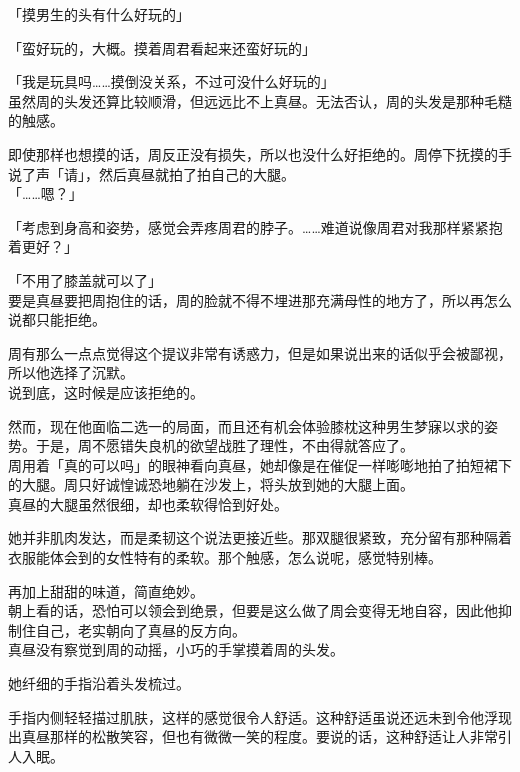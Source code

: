 「摸男生的头有什么好玩的」

「蛮好玩的，大概。摸着周君看起来还蛮好玩的」

「我是玩具吗……摸倒没关系，不过可没什么好玩的」\\

虽然周的头发还算比较顺滑，但远远比不上真昼。无法否认，周的头发是那种毛糙的触感。

即使那样也想摸的话，周反正没有损失，所以也没什么好拒绝的。周停下抚摸的手说了声「请」，然后真昼就拍了拍自己的大腿。\\

「……嗯？」

「考虑到身高和姿势，感觉会弄疼周君的脖子。……难道说像周君对我那样紧紧抱着更好？」

「不用了膝盖就可以了」\\

要是真昼要把周抱住的话，周的脸就不得不埋进那充满母性的地方了，所以再怎么说都只能拒绝。

周有那么一点点觉得这个提议非常有诱惑力，但是如果说出来的话似乎会被鄙视，所以他选择了沉默。\\

说到底，这时候是应该拒绝的。

然而，现在他面临二选一的局面，而且还有机会体验膝枕这种男生梦寐以求的姿势。于是，周不愿错失良机的欲望战胜了理性，不由得就答应了。\\

周用着「真的可以吗」的眼神看向真昼，她却像是在催促一样嘭嘭地拍了拍短裙下的大腿。周只好诚惶诚恐地躺在沙发上，将头放到她的大腿上面。\\

真昼的大腿虽然很细，却也柔软得恰到好处。

她并非肌肉发达，而是柔韧这个说法更接近些。那双腿很紧致，充分留有那种隔着衣服能体会到的女性特有的柔软。那个触感，怎么说呢，感觉特别棒。

再加上甜甜的味道，简直绝妙。\\

朝上看的话，恐怕可以领会到绝景，但要是这么做了周会变得无地自容，因此他抑制住自己，老实朝向了真昼的反方向。\\

真昼没有察觉到周的动摇，小巧的手掌摸着周的头发。

她纤细的手指沿着头发梳过。

手指内侧轻轻描过肌肤，这样的感觉很令人舒适。这种舒适虽说还远未到令他浮现出真昼那样的松散笑容，但也有微微一笑的程度。要说的话，这种舒适让人非常引人入眠。\\

